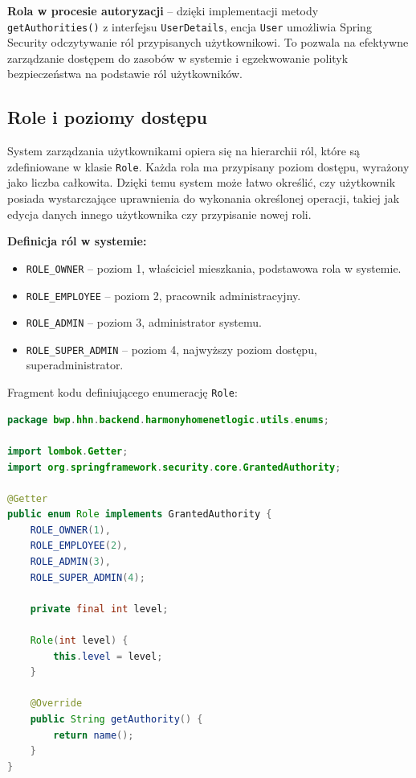 \textbf{Rola w procesie autoryzacji} -- dzięki implementacji metody \texttt{getAuthorities()} z interfejsu \texttt{UserDetails}, encja \texttt{User} umożliwia Spring Security odczytywanie ról przypisanych użytkownikowi. To pozwala na efektywne zarządzanie dostępem do zasobów w systemie i egzekwowanie polityk bezpieczeństwa na podstawie ról użytkowników.


\subsection{Role i poziomy dostępu}

System zarządzania użytkownikami opiera się na hierarchii ról, które są zdefiniowane w klasie \texttt{Role}. Każda rola ma przypisany poziom dostępu, wyrażony jako liczba całkowita. Dzięki temu system może łatwo określić, czy użytkownik posiada wystarczające uprawnienia do wykonania określonej operacji, takiej jak edycja danych innego użytkownika czy przypisanie nowej roli.

\textbf{Definicja ról w systemie:}
\begin{itemize}
    \item \texttt{ROLE\_OWNER} -- poziom 1, właściciel mieszkania, podstawowa rola w systemie.
    \item \texttt{ROLE\_EMPLOYEE} -- poziom 2, pracownik administracyjny.
    \item \texttt{ROLE\_ADMIN} -- poziom 3, administrator systemu.
    \item \texttt{ROLE\_SUPER\_ADMIN} -- poziom 4, najwyższy poziom dostępu, superadministrator.
\end{itemize}

Fragment kodu definiującego enumerację \texttt{Role}:
\begin{lstlisting}[language=Java, style=JavaStyle, caption=Definicja ról w systemie \texttt{Role}]
package bwp.hhn.backend.harmonyhomenetlogic.utils.enums;

import lombok.Getter;
import org.springframework.security.core.GrantedAuthority;

@Getter
public enum Role implements GrantedAuthority {
    ROLE_OWNER(1),
    ROLE_EMPLOYEE(2),
    ROLE_ADMIN(3),
    ROLE_SUPER_ADMIN(4);

    private final int level;

    Role(int level) {
        this.level = level;
    }

    @Override
    public String getAuthority() {
        return name();
    }
}
\end{lstlisting}

